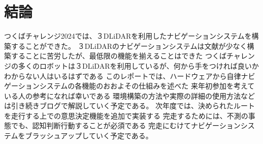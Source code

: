 \section{結論}
つくばチャレンジ2024では、３DLiDARを利用したナビゲーションシステムを構築することができた。
３DLiDARのナビゲーションシステムは文献が少なく構築することに苦労したが、最低限の機能を揃えることはできた
つくばチャレンジの多くのロボットは３DLiDARを利用しているが、何から手をつければ良いかわからない人はいるはずである
このレポートでは、ハードウェアから自律ナビゲーションシステムの各機能のおおよその仕組みを述べた
来年初参加を考えている人の参考になれば幸いである
環境構築の方法や実際の詳細の使用方法などは引き続きブログで解説していく予定である。
次年度では、決められたルートを走行する上での意思決定機能を追加で実装する
完走するためには、不測の事態でも、認知判断行動することが必須である
完走にむけてナビゲーションシステムをブラッシュアップしていく予定である。